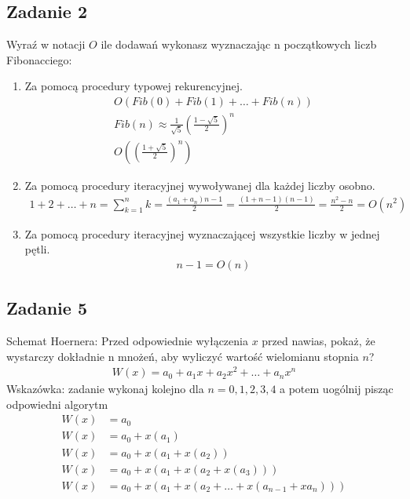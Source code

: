 \documentclass{article}
\begin{document}
\subsection*{Zadanie 2}
Wyraź w notacji $O$ ile dodawań wykonasz wyznaczając n początkowych liczb Fibonacciego:
\begin{enumerate}[label=(\alph*)]
    \item Za pomocą procedury typowej rekurencyjnej.
          \begin{gather*}
              O(Fib(0) + Fib(1) + \dots + Fib(n)) \\
              Fib(n) \approx \frac{1}{\sqrt{5}}\left(\frac{1-\sqrt{5}}{2}\right)^n \\
              O\left(\left(\frac{1+\sqrt{5}}{2}\right)^n\right)
          \end{gather*}
    \item Za pomocą procedury iteracyjnej wywoływanej dla każdej liczby osobno.
          \begin{gather*}
              1 + 2 + \dots + n = \sum_{k=1}^{n}k = \frac{(a_1+a_n)n-1}{2} = \frac{(1+n-1)(n-1)}{2} = \frac{n^2-n}{2} = O(n^2)
          \end{gather*}
    \item Za pomocą procedury iteracyjnej wyznaczającej wszystkie liczby w jednej pętli.
          \begin{gather*}
              n - 1 = O(n)
          \end{gather*}
\end{enumerate}

\subsection*{Zadanie 5}
Schemat Hoernera: Przed odpowiednie wyłączenia $x$ przed nawias, pokaż, że wystarczy
dokładnie n mnożeń, aby wyliczyć wartość wielomianu stopnia $n$?
\begin{gather*}
    W(x) = a_0 + a_1x + a_2x^2 + \dots + a_nx^n
\end{gather*}
Wskazówka: zadanie wykonaj kolejno dla $n = 0, 1, 2, 3, 4$ a potem uogólnij pisząc odpowiedni algorytm
\begin{align*}
    W(x) & = a_0                                                    \\
    W(x) & = a_0 + x(a_1)                                           \\
    W(x) & = a_0 + x(a_1 + x(a_2))                                  \\
    W(x) & = a_0 + x(a_1 + x(a_2 + x(a_3)))                         \\
    W(x) & = a_0 + x(a_1 + x(a_2 + \dots + x(a_{n-1} + xa_n)))
\end{align*}
\end{document}
